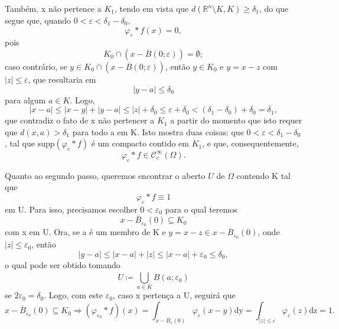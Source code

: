 \documentclass[../distribution_theory_notes.tex]{subfiles}
\begin{document}
\begin{proof*}
                 Também, x não pertence a \(K_1\), tendo em vista que \(d(\mathbb{R}^{n}\setminus{K}, K)\geq \delta_1\), do que segue que, quando \(0<\varepsilon <\delta_1-\delta_0,\)
                   \[
                     \varphi_\varepsilon *f(x)=0,
                   \]
                   pois 
                     \[
                       K_{0}\cap (x-\overline{B}(0; \varepsilon ))=\emptyset;
                     \]
                     caso contrário, se \(y\in K_{0}\cap (x-\overline{B}(0; \varepsilon ))\), então \(y\in K_{0}\) e \(y=x-z\) com \(|z|\leq \varepsilon \), que resultaria em 
                       \[
                         |y-a|\leq \delta_{0}
                       \]
                       para algum \(a\in K\). Logo, 
                         \[
                           |x-a|\leq |x-y|+|y-a|\leq |z|+\delta_{0}\leq \varepsilon +\delta_{0}<(\delta_1-\delta_0)+\delta_0=\delta_1,
                         \]
                         que contradiz o fato de x não pertencer a \(K_1\) a partir do momento que isto requer que \(d(x, a)>\delta_1\) para todo a em K. Isto mostra duas coisas: que \(0<\varepsilon <\delta_1-\delta_0\), tal que \(\mathrm{supp}(\varphi_\varepsilon *f)\) é um compacto contido em \(K_1\), e que, consequentemente, 
                           \[
                             \varphi_\varepsilon *f\in \mathcal{C}_{c}^{\infty}(\Omega ).
                           \]

                           Quanto ao segundo passo, queremos encontrar o aberto \(U\) de \(\Omega \) contendo K tal que 
                             \[
                               \varphi_\varepsilon *f\equiv 1
                             \]
                             em U. Para isso, precisamos escolher \(0<\varepsilon_0\) para o qual teremos 
                               \[
                                 x-\overline{B}_{\varepsilon_{0}}(0)\subseteq K_{0}
                               \]
                               com x em U. Ora, se a é um membro de K e \(y=x-z\in x-\overline{B}_{\varepsilon_{0} }(0)\), onde \(|z|\leq \varepsilon_{0}\), então 
                                 \[
                                   |y-a|\leq |x-a|+|z|\leq |x-a|+\varepsilon_{0} \leq \delta_{0},
                                 \]
                                 o qual pode ser obtido tomando 
                                   \[
                                     U\coloneqq \bigcup_{a\in K}^{}B(a; \varepsilon_{0})
                                   \]
                                   se \(2\varepsilon_{0}=\delta_{0}\). Logo, com este \(\varepsilon_{0}\), caso x pertença a U, seguirá que 
                                     \[
                                       x-\overline{B}_{\varepsilon_{0}}(0)\subseteq K_{0}\Rightarrow (\varphi_{\varepsilon_{0}}*f)(x)=\int_{x-\overline{B}_{\varepsilon }(0)}^{}\varphi_{\varepsilon }(x-y) \mathrm{dy}=\int_{|z|\leq \varepsilon }^{}\varphi_{\varepsilon }(z) \mathrm{dz}=1.
                                     \]


\end{proof*}
\end{document}
